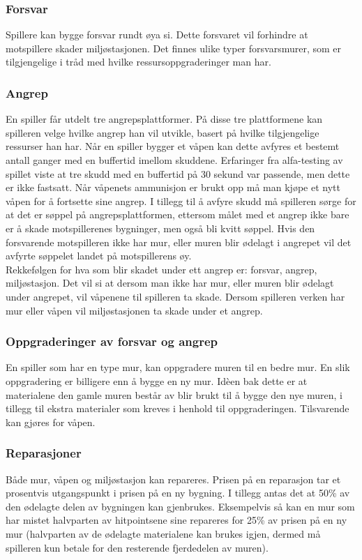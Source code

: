 \subsubsection{Forsvar}
Spillere kan bygge forsvar rundt øya si. Dette forsvaret vil forhindre at
motspillere skader miljøstasjonen. Det finnes ulike typer
forsvarsmurer, som er tilgjengelige i tråd med hvilke ressursoppgraderinger man har. 
\subsubsection{Angrep}
En spiller får utdelt tre angrepsplattformer. På disse tre plattformene
kan spilleren velge hvilke angrep han vil utvikle, basert på hvilke
tilgjengelige ressurser han har. Når en spiller bygger et våpen kan dette avfyres et bestemt antall ganger med en buffertid imellom skuddene. Erfaringer fra alfa-testing av spillet viste at tre skudd med en buffertid på 30 sekund var passende, men dette er ikke fastsatt. Når våpenets ammunisjon er brukt opp må man kjøpe et nytt våpen for å fortsette sine angrep. 
I tillegg til å avfyre skudd må spilleren sørge for at det er søppel på angrepsplattformen, ettersom målet med et angrep ikke bare er å skade motspillerenes bygninger, men også bli kvitt søppel. Hvis den forsvarende motspilleren ikke har mur, eller muren blir ødelagt i angrepet vil det avfyrte søppelet landet på motspillerens øy. \\
Rekkefølgen for hva som blir skadet under ett angrep er: forsvar, angrep, miljøstasjon. Det vil si at dersom man ikke har mur, eller muren blir ødelagt under angrepet, vil våpenene til spilleren ta skade. Dersom spilleren verken har mur eller våpen vil miljøstasjonen ta skade under et angrep. 
\subsubsection{Oppgraderinger av forsvar og angrep}
En spiller som har en type mur, kan oppgradere muren til en bedre mur. En slik oppgradering er billigere enn å bygge en ny mur. Idèen bak dette er at materialene den gamle muren består av blir brukt til å bygge den nye muren, i tillegg til ekstra materialer som kreves i henhold til oppgraderingen. Tilsvarende kan gjøres for våpen.
\subsubsection{Reparasjoner}
Både mur, våpen og miljøstasjon kan repareres. Prisen på en reparasjon tar et prosentvis utgangspunkt i prisen på en ny bygning. I tillegg antas det at 50\% av den ødelagte delen av bygningen kan gjenbrukes. Eksempelvis så kan en mur som har mistet halvparten av hitpointsene sine repareres for 25\% av prisen på en ny mur (halvparten av de ødelagte materialene kan brukes igjen, dermed må spilleren kun betale for den resterende fjerdedelen av muren).
